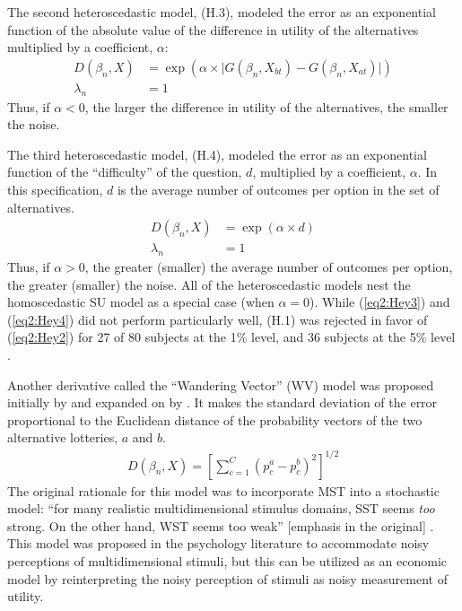 \documentclass[../main.tex]{subfiles}
\begin{document}
The second heteroscedastic model, (H.3), modeled the error as an exponential function of the absolute value of the difference in utility of the alternatives multiplied by a coefficient, $\alpha$:
\begin{align*}
	\tag{H.3}
	\label{eq2:Hey3}
	D(\beta_n,X) &= \exp\left(\alpha \times \lvert G(\beta_n,X_{bt}) - G(\beta_n,X_{at}) \rvert\right)\\
	\lambda_n &= 1
\end{align*}
Thus, if $\alpha < 0$, the larger the difference in utility of the alternatives, the smaller the noise.

The third heteroscedastic model, (H.4), modeled the error as an exponential function of the \enquote{difficulty} of the question, $d$, multiplied by a coefficient, $\alpha$.
In this specification, $d$ is the average number of outcomes per option in the set of alternatives.
\begin{align*}
	\tag{H.4}
	\label{eq2:Hey4}
	D(\beta_n,X) &= \exp(\alpha \times d)\\
	\lambda_n &= 1
\end{align*}
Thus, if $\alpha > 0$, the greater (smaller) the average number of outcomes per option, the greater (smaller) the noise.
All of the heteroscedastic models nest the homoscedastic SU model as a special case (when $\alpha=0$).
While (\ref{eq2:Hey3}) and (\ref{eq2:Hey4}) did not perform particularly well, (H.1) was rejected in favor of (\ref{eq2:Hey2}) for 27 of 80 subjects at the 1\% level, and 36 subjects at the 5\% level \parencite*[639]{Hey1995a}.

Another derivative called the \enquote{Wandering Vector} (WV) model was proposed initially by \textcite{Carroll1980} and expanded on by \textcite{Carroll1991}.
It makes the standard deviation of the error proportional to the Euclidean distance of the probability vectors of the two alternative lotteries, $a$ and $b$.
\begin{align*}
	D(\beta_n,X) = \left[  \sum_{c=1}^C (p_c^a - p_c^b)^2 \right]^{1/2}
\end{align*}
The original rationale for this model was to incorporate MST into a stochastic model: \enquote{for many realistic multidimensional stimulus domains, SST seems \textit{too} strong.
On the other hand, WST seems too weak} [emphasis in the original] \parencite*[343]{Carroll1991}.
This model was proposed in the psychology literature to accommodate noisy perceptions of multidimensional stimuli, but this can be utilized as an economic model by reinterpreting the noisy perception of stimuli as noisy measurement of utility.
\end{document}
